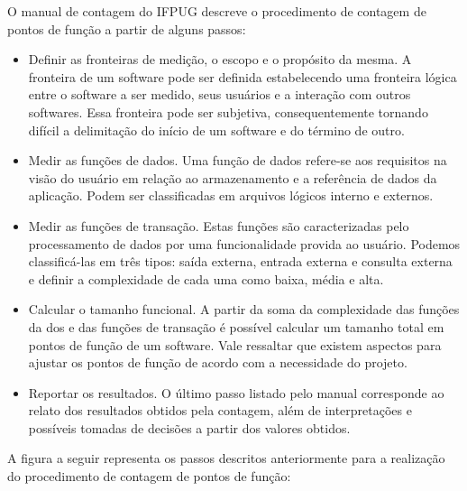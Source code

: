 O manual de contagem do IFPUG descreve o procedimento de contagem de pontos de função a partir de alguns passos: \cite{IFPUG:2010}

\begin{itemize}

	\item Definir as fronteiras de medição, o escopo e o propósito da mesma. A fronteira de um software pode ser definida estabelecendo uma fronteira lógica entre o software a ser medido, seus usuários e a interação com outros softwares. Essa fronteira pode ser subjetiva, consequentemente tornando difícil a delimitação do início de um software e do término de outro. \cite{Marcos:2015}

	\item Medir as funções de dados. Uma função de dados refere-se aos requisitos na visão do usuário em relação ao armazenamento e a referência de dados da aplicação. Podem ser classificadas em arquivos lógicos interno e externos.

	\item Medir as funções de transação. Estas funções são caracterizadas pelo processamento de dados por uma funcionalidade provida ao usuário. Podemos classificá-las em três tipos: saída externa, entrada externa e consulta externa e definir a complexidade de cada uma como baixa, média e alta.

	\item Calcular o tamanho funcional. A partir da soma da complexidade das funções da dos e das funções de transação é possível calcular um tamanho total em pontos de função de um software. Vale ressaltar que existem aspectos para ajustar os pontos de função de acordo com a necessidade do projeto.

	\item Reportar os resultados. O último passo listado pelo manual corresponde ao relato dos resultados obtidos pela contagem, além de interpretações e possíveis tomadas de decisões a partir dos valores obtidos.

\end{itemize}

A figura a seguir representa os passos descritos anteriormente para a realização do procedimento de contagem de pontos de função:

